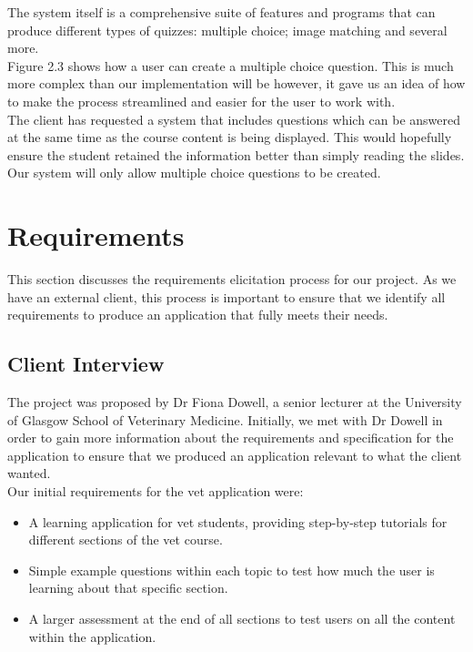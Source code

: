 \documentclass{l3proj}
\begin{document}
The system itself is a comprehensive suite of features and programs
that can produce different types of quizzes: multiple choice; image
matching and several more.\\

Figure 2.3 shows how a user can create a multiple choice question. This is much more complex than our implementation will be however, it gave us an idea of how to make the process streamlined and easier for the user to work with.\\ 

The client has requested a system that includes questions which can be
answered at the same time as the course content is being
displayed. This would hopefully ensure the student retained the
information better than simply reading the slides. Our system will
only allow multiple choice questions to be created.

\chapter{Requirements}
\label{req}

This section discusses the requirements elicitation process for our project. As we have an external client, this process is important to ensure that we identify all requirements to produce an application that fully meets their needs.

\section{Client Interview}

The project was proposed by Dr Fiona Dowell, a senior lecturer at the University of Glasgow School of Veterinary Medicine. Initially, we met with Dr Dowell in order to gain more information about the requirements and specification for the application to ensure that we produced an application relevant to what the client wanted.\\

Our initial requirements for the vet application were:

\begin{itemize}
\item A learning application for vet students, providing step-by-step tutorials for different sections of the vet course.
\item Simple example questions within each topic to test how much the user is learning about that specific section.
\item A larger assessment at the end of all sections to test users on all the content within the application.
\end{itemize}
\end{document}
